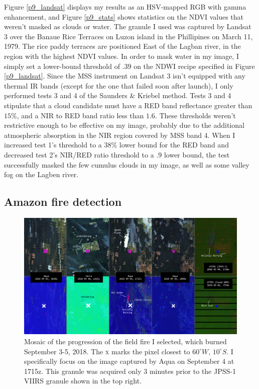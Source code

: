 \documentclass[12pt]{article}
\begin{document}
Figure \ref{p9_landsat} displays my results as an HSV-mapped RGB with gamma enhancement, and Figure \ref{p9_stats} shows statistics on the NDVI values that weren't masked as clouds or water. The granule I used was captured by Landsat 3 over the Banaue Rice Terraces on Luzon island in the Phillipines on March 11, 1979. The rice paddy terraces are positioned East of the Lagban river, in the region with the highest NDVI values. In order to mask water in my image, I simply set a lower-bound threshold of $.39$ on the NDWI recipe specified in Figure \ref{p9_landsat}. Since the MSS instrument on Landsat 3 isn't equipped with any thermal IR bands (except for the one that failed soon after launch), I only performed tests 3 and 4 of the Saunders \& Kriebel method. Tests 3 and 4 stipulate that a cloud candidate must have a RED band reflectance greater than $15\%$, and a NIR to RED band ratio less than $1.6$. These thresholds weren't restrictive enough to be effective on my image, probably due to the additional atmospheric absorption in the NIR region covered by MSS band 4. When I increased test 1's threshold to a $38\%$ lower bound for the RED band and decreased test 2's NIR/RED ratio threshold to a $.9$ lower bound, the test successfully masked the few cumulus clouds in my image, as well as some valley fog on the Lagben river.

\clearpage

\subsection{Amazon fire detection}

\begin{figure}[h!]
    \centering
    \includegraphics[width=.99\linewidth]{figures/p11/fire_mosaic_labeled.png}
    \caption{Mosaic of the progression of the field fire I selected, which burned September 3-5, 2018. The \textsc{x} marks the pixel closest to $60^\circ W$, $10^\circ S$. I specifically focus on the image captured by Aqua on September 4 at 1715z. This granule was acquired only 3 minutes prior to the JPSS-1 VIIRS granule shown in the top right.}
    \label{p11_mosaic}
\end{figure}
\end{document}
